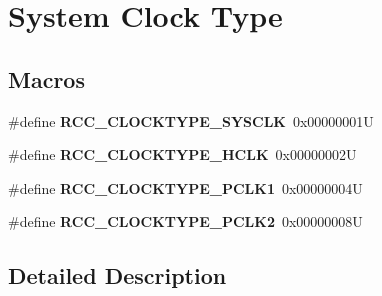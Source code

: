 \hypertarget{group___r_c_c___system___clock___type}{}\section{System Clock Type}
\label{group___r_c_c___system___clock___type}
\subsection*{Macros}
\begin{DoxyCompactItemize}
\item 
\mbox{\label{group___r_c_c___system___clock___type_ga7e721f5bf3fe925f78dae0356165332e}} 
\#define {\bfseries R\+C\+C\+\_\+\+C\+L\+O\+C\+K\+T\+Y\+P\+E\+\_\+\+S\+Y\+S\+C\+LK}~0x00000001U
\item 
\mbox{\label{group___r_c_c___system___clock___type_gaa5330efbd790632856a2b15851517ef9}} 
\#define {\bfseries R\+C\+C\+\_\+\+C\+L\+O\+C\+K\+T\+Y\+P\+E\+\_\+\+H\+C\+LK}~0x00000002U
\item 
\mbox{\label{group___r_c_c___system___clock___type_gab00c7b70f0770a616be4b5df45a454c4}} 
\#define {\bfseries R\+C\+C\+\_\+\+C\+L\+O\+C\+K\+T\+Y\+P\+E\+\_\+\+P\+C\+L\+K1}~0x00000004U
\item 
\mbox{\label{group___r_c_c___system___clock___type_gaef7e78706e597a6551d71f5f9ad60cc0}} 
\#define {\bfseries R\+C\+C\+\_\+\+C\+L\+O\+C\+K\+T\+Y\+P\+E\+\_\+\+P\+C\+L\+K2}~0x00000008U
\end{DoxyCompactItemize}


\subsection{Detailed Description}
